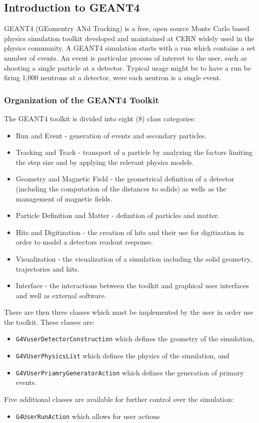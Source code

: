 \subsection{Introduction to GEANT4}

GEANT4 (GEomentry ANd Tracking) is a free, open source Monte Carlo based physics simulation toolkit developed and maintained at CERN widely used in the physics community.
A GEANT4 simulation starts with a run which contains a set number of events.
An event is particular process of interest to the user, such as shooting a single particle at a detector. 
Typical usage might be to have a run be firing 1,000 neutrons at a detector, were each neutron is a single event.


\subsubsection{Organization of the GEANT4 Toolkit}
The GEANT4 toolkit is divided into eight (8) class categories:
\begin{itemize}
    \item Run and Event - generation of events and secondary particles.
    \item Tracking and Track - transport of a particle by analyzing the factors limiting the step size and by applying the relevant physics models.
    \item Geometry and Magnetic Field - the geometrical definition of a detector (including the computation of the distances to solids) as wells as the management of magnetic fields.
    \item Particle Definition and Matter - definition of particles and matter.
    \item Hits and Digitization - the creation of hits and their use for digitization in order to model a detectors readout response.
    \item Visualization - the visualization of a simulation including the solid geometry, trajectories and hits.
    \item Interface - the interactions between the toolkit and graphical user interfaces and well as external software.
\end{itemize}

There are then three classes which must be implemented by the user in order use the toolkit. These classes are:
\begin{itemize}
    \item \verb+G4VuserDetectorConstruction+ which defines the geometry of the simulation,
    \item \verb+G4VUserPhysicsList+ which defines the physics of the simulation, and
    \item \verb+G4VUserPriamryGeneratorAction+ which defines the generation of primary events.
\end{itemize}
Five additional classes are available for further control over the simulation:
\begin{itemize}
    \item \verb+G4UserRunAction+ which allows for user actions
\end{itemize}
